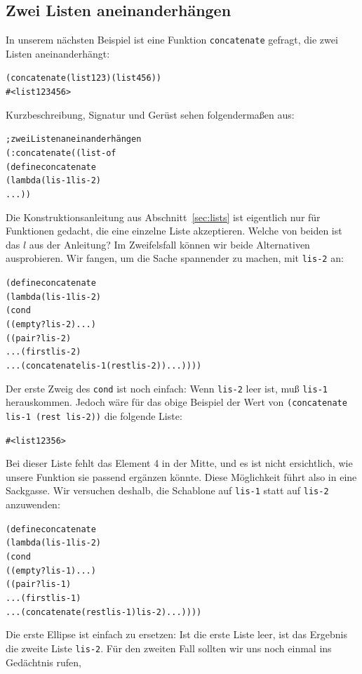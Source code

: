 \subsection{Zwei Listen aneinanderhängen}
In unserem nächsten Beispiel ist eine Funktion
\texttt{concatenate} gefragt, die zwei
Listen aneinanderhängt:\label{sec:concatenate}
% 
\begin{alltt}
(concatenate (list 1 2 3) (list 4 5 6))
\evalsto{} #<list 1 2 3 4 5 6>
\end{alltt}
%
Kurzbeschreibung, Signatur und Gerüst sehen folgendermaßen aus:
%
\begin{alltt}
; zwei Listen aneinanderhängen
(: concatenate ((list-of %
(define concatenate
  (lambda (lis-1 lis-2)
    ...))
\end{alltt}
%
Die Konstruktionsanleitung aus Abschnitt~\ref{sec:lists} ist
eigentlich nur für Funktionen gedacht, die eine einzelne Liste
akzeptieren.  Welche von beiden ist das $l$ aus der Anleitung?  Im
Zweifelsfall können wir beide Alternativen ausprobieren.  Wir
fangen, um die Sache spannender zu machen, mit \texttt{lis-2} an:
%
\begin{alltt}
(define concatenate
  (lambda (lis-1 lis-2)
    (cond
      ((empty? lis-2) ...)
      ((pair? lis-2) 
       ... (first lis-2)
       ... (concatenate lis-1 (rest lis-2)) ...))))
\end{alltt}
%
Der erste Zweig des \texttt{cond} ist noch einfach: Wenn
\texttt{lis-2} leer ist, muß \texttt{lis-1} herauskommen.  Jedoch wäre für
das obige Beispiel der Wert von \texttt{(concatenate lis-1 (rest lis-2))} die
folgende Liste:
%
\begin{alltt}
#<list 1 2 3 5 6>
\end{alltt}
%
Bei dieser Liste fehlt das
Element 4 in der Mitte, und es ist nicht ersichtlich, wie unsere Funktion
sie passend ergänzen könnte.  Diese
Möglichkeit führt also in eine Sackgasse. Wir versuchen deshalb, die Schablone  auf
\texttt{lis-1} 
 statt auf \texttt{lis-2} anzuwenden:
%
\begin{alltt}
(define concatenate
  (lambda (lis-1 lis-2)
    (cond
      ((empty? lis-1) ...)
      ((pair? lis-1) 
       ... (first lis-1)
       ... (concatenate (rest lis-1) lis-2) ...))))
\end{alltt}
%
Die erste Ellipse ist einfach zu ersetzen:  Ist die erste Liste
leer, ist das Ergebnis die zweite Liste \texttt{lis-2}.  Für den
zweiten Fall sollten wir uns noch einmal ins Gedächtnis rufen,
